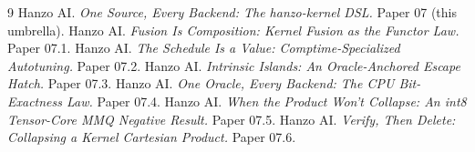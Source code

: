 \documentclass[11pt]{article}
\begin{document}
\begin{thebibliography}{9}
\small
{} Hanzo AI. \emph{One Source, Every Backend: The hanzo-kernel DSL.} Paper 07 (this umbrella).
 Hanzo AI. \emph{Fusion Is Composition: Kernel Fusion as the Functor Law.} Paper 07.1.
 Hanzo AI. \emph{The Schedule Is a Value: Comptime-Specialized Autotuning.} Paper 07.2.
 Hanzo AI. \emph{Intrinsic Islands: An Oracle-Anchored Escape Hatch.} Paper 07.3.
 Hanzo AI. \emph{One Oracle, Every Backend: The CPU Bit-Exactness Law.} Paper 07.4.
 Hanzo AI. \emph{When the Product Won't Collapse: An int8 Tensor-Core MMQ Negative Result.} Paper 07.5.
 Hanzo AI. \emph{Verify, Then Delete: Collapsing a Kernel Cartesian Product.} Paper 07.6.
\end{thebibliography}
\end{document}
